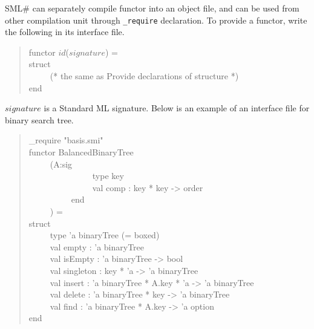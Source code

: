 \documentclass{jbook}
\newcommand{\smlsharp}{SML\#}
\newenvironment{program}{\begin{tt}\begin{quote}}{\end{quote}\end{tt}}
\newcommand{\myem}{\ \ \ \ \  }
\begin{document}
\else%
	\smlsharp{} can separately compile functor into an object file,
and can be used from other compilation unit through {\tt \_require}
declaration.
	To provide a functor, write the following in its interface file.
\begin{program}
functor $id$($signature$) =\\
struct\\
\myem (* the same as Provide declarations of structure *)\\
end
\end{program}
	$signature$ is a Standard ML signature.
	Below is an example of an interface file for binary search tree.
\begin{program}
\_require "basis.smi"\\
functor BalancedBinaryTree\\
\myem  (A:sig\\
\myem\myem\myem      type key\\
\myem\myem\myem      val comp : key * key -> order\\
\myem\myem    end\\
\myem  ) =\\
struct\\
\myem type 'a binaryTree (= boxed)\\
\myem  val empty : 'a binaryTree\\
\myem  val isEmpty : 'a binaryTree -> bool\\
\myem  val singleton : key * 'a -> 'a binaryTree\\
\myem  val insert : 'a binaryTree * A.key * 'a -> 'a binaryTree\\
\myem  val delete : 'a binaryTree * key -> 'a binaryTree\\
\myem  val find : 'a binaryTree * A.key -> 'a option\\
end
\end{program}
\end{document}
